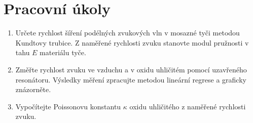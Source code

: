 \documentclass[a4paper]{article}
\author{Vladislav Wohlrath}
\begin{document}
\begin{titlepage}

\end{titlepage}

\section*{Pracovní úkoly}
\begin{enumerate}
\item Určete rychlost šíření podélných zvukových vln v mosazné tyči metodou Kundtovy trubice. Z naměřené rychlosti zvuku stanovte modul pružnosti v tahu $E$ materiálu tyče.
\item Změřte rychlost zvuku ve vzduchu a v oxidu uhličitém pomocí uzavřeného resonátoru. Výsledky měření zpracujte metodou lineární regrese a graficky znázorněte.
\item Vypočítejte Poissonovu konstantu $\kappa$ oxidu uhličitého z naměřené rychlosti zvuku.
\end{enumerate}












\printbibliography[title={Seznam použité literatury}]
\end{document}

